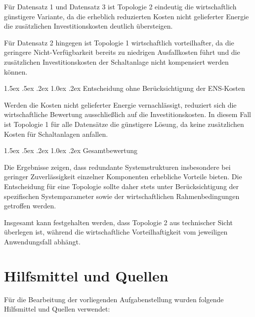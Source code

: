 \documentclass[a4paper,12pt]{article}
\makeatletter
\renewcommand\paragraph{\@startsection{paragraph}{4}{\z@}%
	{1.5ex \@plus .5ex \@minus .2ex}%
	{1.0ex \@plus .2ex}%
	{\normalfont\normalsize\bfseries}}%
\makeatother
\begin{document}
Für Datensatz 1 und Datensatz 3 ist Topologie 2 eindeutig die
wirtschaftlich günstigere Variante, da die erheblich reduzierten Kosten
nicht gelieferter Energie die zusätzlichen Investitionskosten deutlich
übersteigen.

Für Datensatz 2 hingegen ist Topologie 1 wirtschaftlich vorteilhafter, da
die geringere Nicht-Verfügbarkeit bereits zu niedrigen Ausfallkosten
führt und die zusätzlichen Investitionskosten der Schaltanlage nicht
kompensiert werden können.

\paragraph{Entscheidung ohne Berücksichtigung der ENS-Kosten}

Werden die Kosten nicht gelieferter Energie vernachlässigt, reduziert
sich die wirtschaftliche Bewertung ausschließlich auf die
Investitionskosten. In diesem Fall ist Topologie 1 für alle Datensätze
die günstigere Lösung, da keine zusätzlichen Kosten für Schaltanlagen
anfallen.

\paragraph{Gesamtbewertung}

Die Ergebnisse zeigen, dass redundante Systemstrukturen insbesondere bei
geringer Zuverlässigkeit einzelner Komponenten erhebliche Vorteile
bieten. Die Entscheidung für eine Topologie sollte daher stets unter
Berücksichtigung der spezifischen Systemparameter sowie der
wirtschaftlichen Rahmenbedingungen getroffen werden.

Insgesamt kann festgehalten werden, dass Topologie 2 aus technischer
Sicht überlegen ist, während die wirtschaftliche Vorteilhaftigkeit vom
jeweiligen Anwendungsfall abhängt.

\section*{Hilfsmittel und Quellen}

Für die Bearbeitung der vorliegenden Aufgabenstellung wurden folgende
Hilfsmittel und Quellen verwendet:
\end{document}
